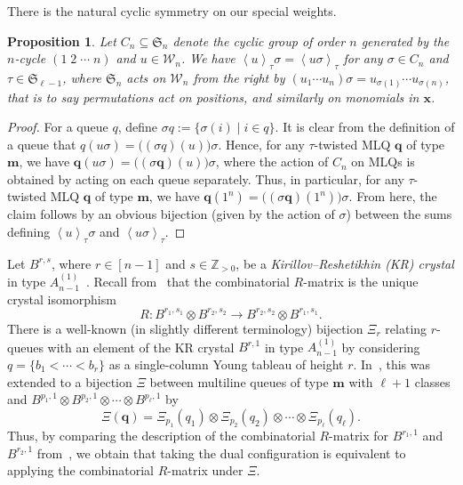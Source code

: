 \documentclass[reqno]{amsart}
\newcommand{\0}{\phantom{c}}
\newcommand{\swt}[1]{\left\langle #1 \right\rangle} %
\newcommand{\SymGp}[1]{\mathfrak{S}_{#1}} %
\newcommand{\mm}{\mathbf{m}}
\newcommand{\qq}{\mathbf{q}}
\newcommand{\xx}{\mathbf{x}}
\newcommand{\mcW}{\mathcal{W}}
\newcommand{\ZZ}{\mathbb{Z}}
\newcommand{\defn}[1]{{\color{darkred}\emph{#1}}} %
\theoremstyle{plain}
\newtheorem{prop}[thm]{Proposition}
\theoremstyle{definition}
\numberwithin{equation}{section}
\begin{document}
There is the natural cyclic symmetry on our special weights.

\begin{prop}
  Let $C_n \subseteq \SymGp{n}$ denote the cyclic group of order $n$ generated by the $n$-cycle $(1 \; 2 \; \dotsm \; n)$ and $u \in \mcW_n$.
  We have $\swt{u}_{\tau}\sigma = \swt{u \sigma}_{\tau}$ for any $\sigma \in C_n$ and $\tau \in \SymGp{\ell-1}$, where $\SymGp{n}$ acts on $\mcW_n$ from the right by $(u_1 \dotsm u_n) \sigma = u_{\sigma(1)} \dotsm u_{\sigma(n)}$, that is to say permutations act on positions, and similarly on monomials in $\xx$.
\end{prop}

\begin{proof}
  For a queue $q$, define $\sigma q := \{ \sigma(i) \mid i \in q\}$.
  It is clear from the definition of a queue that $q(u \sigma) = \bigl( (\sigma q)(u) \bigr) \sigma$.
  Hence, for any $\tau$-twisted MLQ $\qq$ of type $\mm$, we have
  $\qq (u \sigma) = \bigl( (\sigma \qq)(u) \bigr) \sigma$,
  where the action of $C_n$ on MLQs is obtained by acting on each queue separately.
  Thus, in particular, for any $\tau$-twisted MLQ $\qq$ of type $\mm$, we have
  $\qq (1^n) = \bigl( (\sigma \qq)(1^n) \bigr) \sigma$.
  From here, the claim follows by an obvious bijection
  (given by the action of $\sigma$) between the sums defining
  $\swt{u}_{\tau} \sigma$ and $\swt{u \sigma}_{\tau}$.
\end{proof}

Let $B^{r,s}$, where $r \in [n-1]$ and $s \in \ZZ_{>0}$, be a \defn{Kirillov--Reshetikhin (KR) crystal} in type $A_{n-1}^{(1)}$~\cite{KKMMNN92}.
Recall from~\cite{NY97,Shimozono02} that the combinatorial $R$-matrix is the unique crystal isomorphism
\[
R \colon B^{r_1,s_1} \otimes B^{r_2,s_2} \to B^{r_2,s_2} \otimes B^{r_1,s_1}.
\]
There is a well-known (in slightly different terminology) bijection $\Xi_r$ relating $r$-queues with an element of the KR crystal $B^{r,1}$ in type $A_{n-1}^{(1)}$ by considering $q = \{b_1 < \cdots < b_r\}$  as a single-column Young tableau of height $r$.
In~\cite{KMO15}, this was extended to a bijection $\Xi$ between multiline queues of type $\mm$ with $\ell+1$ classes and $B^{p_1,1} \otimes B^{p_2,1} \otimes \dotsm \otimes B^{p_{\ell},1}$ by
\[
\Xi(\qq) = \Xi_{p_1}(q_1) \otimes \Xi_{p_2}(q_2) \otimes \dotsm \otimes \Xi_{p_{\ell}}(q_{\ell}).
\]
Thus, by comparing the description of the combinatorial $R$-matrix for $B^{r_1,1}$ and $B^{r_2,1}$ from~\cite{NY97}, we obtain that taking the dual configuration is equivalent to applying the combinatorial $R$-matrix under $\Xi$.
\end{document}
